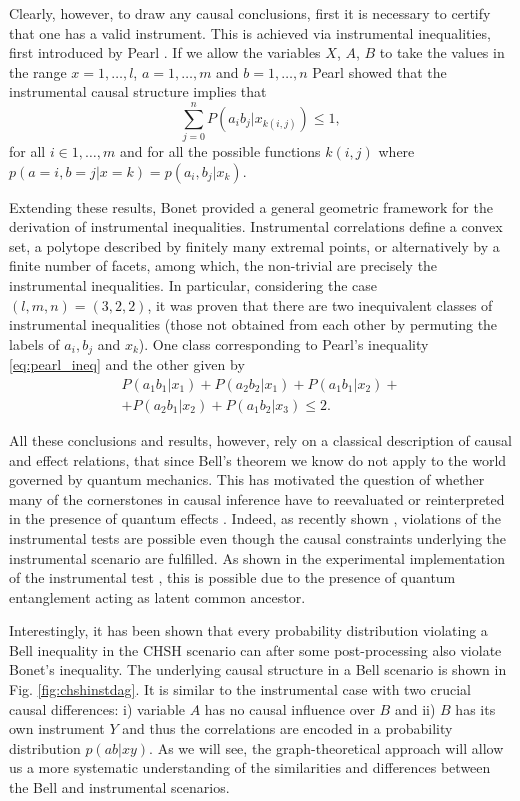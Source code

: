 \documentclass[letterpaper]{article}
\begin{document}
Clearly, however, to draw any causal conclusions, first it is necessary to
certify that one has a valid instrument. This is achieved via instrumental
inequalities, first introduced by Pearl \cite{pearl1995}. If we allow the variables $X$,
$A$, $B$ to take the values in the range  $x=1,\dots,l$, $a=1,\dots,m$ and
$b=1,\dots,n$ Pearl showed that the instrumental causal structure implies that 
\begin{equation} 
    \sum_{j=0}^{n} P(a_i b_j|x_{k(i,j)}) \le 1,
    \label{eq:pearl_ineq}
\end{equation}
for all $i \in {1,\ldots, m}$ and for all the possible functions $k(i,j)$ where $p(a=i,b=j\vert x=k)=p(a_i,b_j|x_k)$.

Extending these results, Bonet \cite{bonet2001} provided a 
general geometric framework for the derivation of instrumental inequalities.
Instrumental correlations define a convex set, a polytope described by finitely
many extremal points, or alternatively by a finite number of facets, among which, the
non-trivial are precisely the instrumental inequalities. In particular,
considering the case $(l,m,n) = (3,2,2)$, it was proven that there are two
inequivalent classes of instrumental inequalities (those not obtained from each
other by permuting the labels of $a_i,b_j$ and $x_k$). One class corresponding
to Pearl's inequality \eqref{eq:pearl_ineq} and the other given by
\begin{multline}
    P(a_1 b_1 | x_1) + P(a_2 b_2 | x_1) + 
    P(a_1 b_1 | x_2) +\\+ P(a_2 b_1 | x_2) + 
    P(a_1 b_2 | x_3) \le 2.
    \label{eq:bonet_ineq}
\end{multline}

All these conclusions and results, however, rely on a classical description of
causal and effect relations, that since Bell's theorem \cite{bell1964} we know do not apply to the world governed by quantum mechanics. This has motivated the
question of whether many of the cornerstones in causal inference have to
reevaluated or reinterpreted in the presence of quantum effects \cite{ried2015,Costa2016}. Indeed, as recently shown \cite{chaves2018}, violations of the instrumental tests are possible even though the causal constraints underlying the instrumental scenario
are fulfilled. As shown in the experimental implementation of the instrumental
test \cite{chaves2018}, this is possible due to the presence of quantum entanglement acting as latent common ancestor.

Interestingly, it has been shown \cite{himbeeck2018} that every probability distribution violating a Bell inequality in the CHSH scenario \cite{CHSH} can after some post-processing also violate Bonet's inequality. The underlying causal structure in a Bell scenario is shown in Fig. \ref{fig:chshinstdag}. It is similar to the instrumental case with two crucial causal differences: i) variable $A$ has no causal influence over $B$ and ii) $B$ has its own instrument $Y$ and thus the correlations are encoded in a probability distribution $p(ab \vert xy)$. As we will see, the graph-theoretical approach will allow us a more systematic understanding of the similarities and differences between the Bell and instrumental scenarios.
\end{document}
